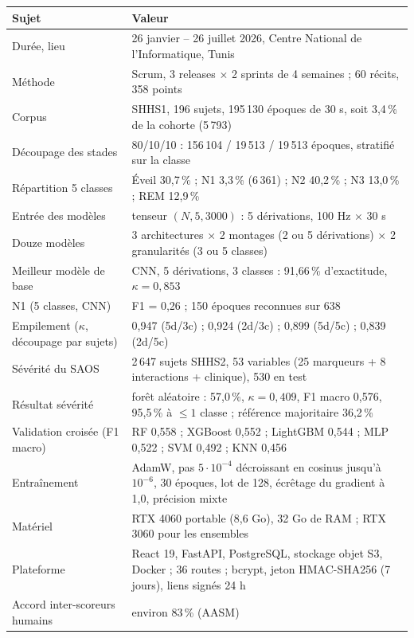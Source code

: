 \documentclass[11pt,a4paper]{report}
\begin{document}
\begin{longtable}{@{}p{6.2cm}p{9.2cm}@{}}
\toprule
\textbf{Sujet} & \textbf{Valeur} \\
\midrule
\endhead
Durée, lieu & 26 janvier -- 26 juillet 2026, Centre National de l'Informatique, Tunis \\
Méthode & Scrum, 3 releases $\times$ 2 sprints de 4 semaines ; 60 récits, 358 points \\
Corpus & SHHS1, 196 sujets, 195\,130 époques de 30 s, soit 3,4\,\% de la cohorte (5\,793) \\
Découpage des stades & 80/10/10 : 156\,104 / 19\,513 / 19\,513 époques, stratifié sur la classe \\
Répartition 5 classes & Éveil 30,7\,\% ; N1 3,3\,\% (6\,361) ; N2 40,2\,\% ; N3 13,0\,\% ; REM 12,9\,\% \\
Entrée des modèles & tenseur $(N, 5, 3000)$ : 5 dérivations, 100 Hz $\times$ 30 s \\
Douze modèles & 3 architectures $\times$ 2 montages (2 ou 5 dérivations) $\times$ 2 granularités (3 ou 5 classes) \\
Meilleur modèle de base & CNN, 5 dérivations, 3 classes : 91,66\,\% d'exactitude, $\kappa = 0{,}853$ \\
N1 (5 classes, CNN) & F1 = 0,26 ; 150 époques reconnues sur 638 \\
Empilement ($\kappa$, découpage par sujets) & 0,947 (5d/3c) ; 0,924 (2d/3c) ; 0,899 (5d/5c) ; 0,839 (2d/5c) \\
Sévérité du SAOS & 2\,647 sujets SHHS2, 53 variables (25 marqueurs + 8 interactions + clinique), 530 en test \\
Résultat sévérité & forêt aléatoire : 57,0\,\%, $\kappa = 0{,}409$, F1 macro 0,576, 95,5\,\% à $\le 1$ classe ; référence majoritaire 36,2\,\% \\
Validation croisée (F1 macro) & RF 0,558 ; XGBoost 0,552 ; LightGBM 0,544 ; MLP 0,522 ; SVM 0,492 ; KNN 0,456 \\
Entraînement & AdamW, pas $5\cdot10^{-4}$ décroissant en cosinus jusqu'à $10^{-6}$, 30 époques, lot de 128, écrêtage du gradient à 1,0, précision mixte \\
Matériel & RTX 4060 portable (8,6 Go), 32 Go de RAM ; RTX 3060 pour les ensembles \\
Plateforme & React 19, FastAPI, PostgreSQL, stockage objet S3, Docker ; 36 routes ; bcrypt, jeton HMAC-SHA256 (7 jours), liens signés 24 h \\
Accord inter-scoreurs humains & environ 83\,\% (AASM) \\
\bottomrule
\end{longtable}
\end{document}
